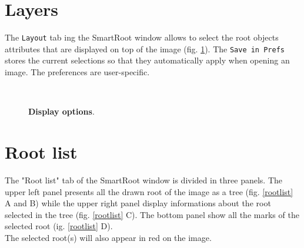 \documentclass[a4paper,english,10pt]{report}
\begin{document}
{\color{coolSection}\section{Layers }}
\label{chapdisp}

The \verb|Layout| tab ing the SmartRoot window allows to select the root objects attributes that are displayed on top of the image (fig. \ref{display}). The \verb|Save in Prefs| stores the current selections so that they automatically apply when opening an image. The preferences are user-specific.
 
 \begin{figure}[!h]
\centering
  \hspace{5mm}   
  \hspace{5mm} 
  \hspace{5mm} \\
  \hspace{5mm} 
  \hspace{5mm} 
  
\caption[Display options]{\textbf{Display options}.}
\label{display}
\end{figure}

\newpage
{\color{coolSection}\section{Root list}}
\label{chaprootlist}

The "Root list" tab of the SmartRoot window is divided in three panels. The upper left panel presents all the drawn root of the image as a tree (fig. \ref{rootlist} A and B) while the upper right panel display informations about the root selected in the tree (fig. \ref{rootlist} C). The bottom panel show all the marks of the selected root (ig. \ref{rootlist} D).\\

The selected root(s) will also appear in red on the image.\\
\end{document}
